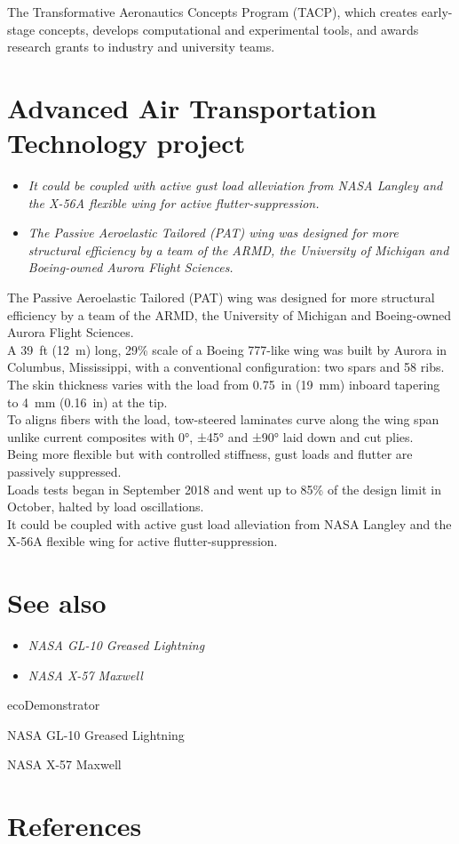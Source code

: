 The Transformative Aeronautics Concepts Program (TACP), which creates
early-stage concepts, develops computational and experimental tools, and
awards research grants to industry and university teams.

\section{Advanced Air Transportation Technology
project}\label{advanced-air-transportation-technology-project}

\begin{itemize}
\item
  \emph{It could be coupled with active gust load alleviation from NASA
  Langley and the X-56A flexible wing for active flutter-suppression.}
\item
  \emph{The Passive Aeroelastic Tailored (PAT) wing was designed for
  more structural efficiency by a team of the ARMD, the University of
  Michigan and Boeing-owned Aurora Flight Sciences.}
\end{itemize}

The Passive Aeroelastic Tailored (PAT) wing was designed for more
structural efficiency by a team of the ARMD, the University of Michigan
and Boeing-owned Aurora Flight Sciences.\\
A 39~ft (12~m) long, 29\% scale of a Boeing 777-like wing was built by
Aurora in Columbus, Mississippi, with a conventional configuration: two
spars and 58 ribs.\\
The skin thickness varies with the load from 0.75~in (19~mm) inboard
tapering to 4~mm (0.16~in) at the tip.\\
To aligns fibers with the load, tow-steered laminates curve along the
wing span unlike current composites with 0°, ±45° and ±90° laid down and
cut plies.\\
Being more flexible but with controlled stiffness, gust loads and
flutter are passively suppressed.\\
Loads tests began in September 2018 and went up to 85\% of the design
limit in October, halted by load oscillations.\\
It could be coupled with active gust load alleviation from NASA Langley
and the X-56A flexible wing for active flutter-suppression.

\section{See also}\label{see-also}

\begin{itemize}
\item
  \emph{NASA GL-10 Greased Lightning}
\item
  \emph{NASA X-57 Maxwell}
\end{itemize}

ecoDemonstrator

NASA GL-10 Greased Lightning

NASA X-57 Maxwell

\section{References}\label{references}
